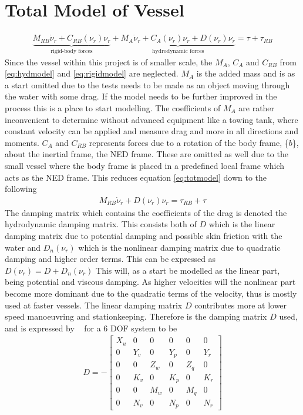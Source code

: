 \section{Total Model of Vessel}
\begin{align}
\underbrace{M_{RB} \dot \nu_r + C_{RB}(\nu_r)\nu_r}_{\text{rigid-body forces}} + \underbrace{M_A \dot \nu_r + C_A(\nu_r)\nu_r + D(\nu_r)\nu_r}_{\text{hydrodynamic forces}}  = \tau + \tau_{RB}
\label{eq:totmodel}
\end{align}
Since the vessel within this project is of smaller scale, the $M_A$, $C_A$ and $C_{RB}$ from \ref{eq:hydmodel} and \ref{eq:rigidmodel} are neglected. $M_A$ is the added mass and is as a start omitted due to the tests needs to be made as an object moving through the water with some drag. If the model needs to be further improved in the process this is a place to start modelling. The coefficients of $M_A$ are rather inconvenient to determine without advanced equipment like a towing tank, where constant velocity can be applied and measure drag and more in all directions and moments. $C_A$ and $C_{RB}$ represents forces due to a rotation of the body frame, \{$b$\}, about the inertial frame, the NED frame. These are omitted as well due to the small vessel where the body frame is placed in a predefined local frame which acts as the NED frame. This reduces equation \ref{eq:totmodel} down to the following
\begin{align}
M_{RB} \dot \nu_r + D(\nu_r)\nu_r = \tau_{RB} + \tau
\label{eq:reducedmodel}
\end{align}
The damping matrix which contains the coefficients of the drag is denoted the hydrodynamic damping matrix. This consists both of $D$ which is the linear damping matrix due to potential damping and possible skin friction with the water and $D_n(\nu_r)$ which is the nonlinear damping matrix due to quadratic damping and higher order terms. This can be expressed as $D(\nu_r) = D + D_n(\nu_r)$ This will, as a start be modelled as the linear part, being potential and viscous damping. As higher velocities will the nonlinear part become more dominant due to the quadratic terms of the velocity, thus is mostly used at faster vessels. The linear damping matrix $D$ contributes more at lower speed manoeuvring and stationkeeping. Therefore is the damping matrix $D$ used, and is expressed by ~\citep{fossen} for a 6 \ac{DOF} system to be
\begin{align}
D =-
\begin{bmatrix}
X_u & 0 & 0 & 0 & 0 & 0\\
0 & Y_v & 0 & Y_p & 0 & Y_r\\
0 & 0 & Z_w & 0 & Z_q & 0\\
0 & K_v & 0 & K_p & 0 & K_r\\
0 & 0 & M_w & 0 & M_q & 0\\
0 & N_v & 0 & N_p & 0 & N_r
\end{bmatrix}
\end{align}

